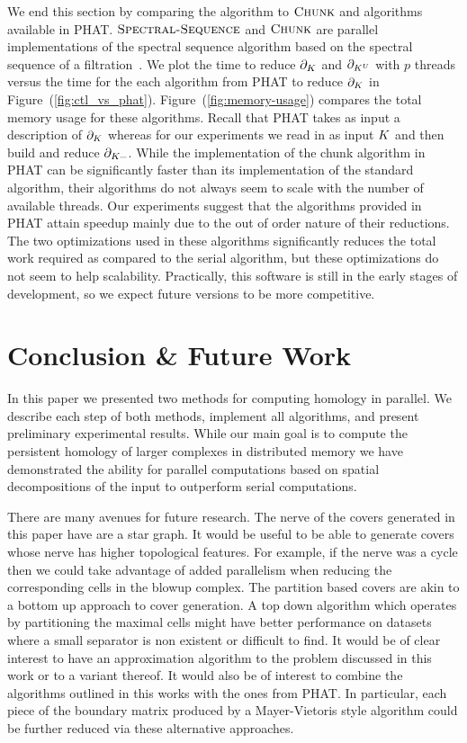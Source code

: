 \documentclass{elsarticle}
\begin{document}
We end this section by comparing the \mv algorithm to $\textnormal{\scshape Chunk}$ and  algorithms available in PHAT.
$\textnormal{\scshape Spectral-Sequence}$ and $\textnormal{\scshape Chunk}$ are parallel implementations of the spectral sequence algorithm based on the spectral sequence of a filtration~\cite{bkr-cccph-13}.
We plot the time to reduce $\partial_{K}$ and $\partial_{K^U}$ with $p$ threads versus the time for the each algorithm from PHAT to reduce 
$\partial_{K}$ in Figure~(\ref{fig:ctl_vs_phat}). 
Figure~(\ref{fig:memory-usage}) compares the total memory usage for these algorithms. Recall that PHAT takes as input
a description of $\partial_{K}$ whereas for our experiments we read in as input $K$ and then build and reduce $\partial_{K^{\_}}$. 
While the implementation of the chunk algorithm in PHAT can be significantly faster than its implementation of the standard algorithm,
their algorithms do not always seem to scale with the number of available threads. Our experiments suggest that the algorithms 
provided in PHAT attain speedup mainly due to the out of order nature of their reductions. The two optimizations used
in these algorithms significantly reduces the total work required as compared to the serial algorithm, but these optimizations 
do not seem to help scalability.  Practically, this software is still in the early stages of development, so we expect future versions to 
be more competitive.

\section{Conclusion \& Future Work}
In this paper we presented two methods for computing homology in parallel. 
We describe each step of both methods, implement all algorithms, and present 
preliminary experimental results. While our main goal is to compute the 
persistent homology of larger complexes in 
distributed memory we have demonstrated the ability for parallel computations 
based on spatial decompositions of the input to outperform serial computations.

There are many avenues for future research. 
The nerve of the covers generated in this paper have are a star graph. 
It would be useful to be able to generate covers whose nerve has higher topological features. 
For example, if the nerve was a cycle then we could take advantage of 
added parallelism when reducing the corresponding cells in the blowup complex. 
The partition based covers are akin to a bottom up approach to cover generation. A top
down algorithm which operates by partitioning the maximal cells might have better performance
on datasets where a small separator is non existent or difficult to find. It would be of clear 
interest to have an approximation algorithm to the problem discussed in this work or to
a variant thereof. It would also be of interest to combine the algorithms outlined in this works with the ones 
from PHAT. In particular, each piece of the boundary matrix produced by a Mayer-Vietoris style 
algorithm could be further reduced via these alternative approaches. 
\end{document}
